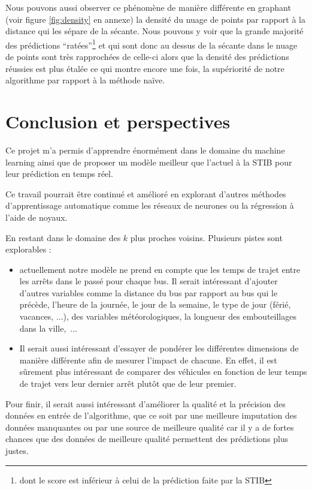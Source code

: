 \documentclass[letterpaper]{article}
\begin{document}
Nous pouvons aussi observer ce phénomène de manière différente en graphant (voir figure \ref{fig:density} en annexe) la densité du nuage de points par rapport à la distance qui les sépare de la sécante. Nous pouvons y voir que la grande majorité des prédictions ``ratées''\footnote{dont le score est inférieur à celui de la prédiction faite par la STIB} et qui sont donc au dessus de la sécante dans le nuage de points sont très rapprochées de celle-ci alors que la densité des prédictions réussies est plus étalée ce qui montre encore une fois, la supériorité de notre algorithme par rapport à la méthode naïve.


\section{Conclusion et perspectives}

Ce projet m'a permis d'apprendre énormément dans le domaine du machine learning ainsi que de proposer un modèle meilleur que l'actuel à la STIB pour leur prédiction en temps réel.

Ce travail pourrait être continué et amélioré en explorant d'autres méthodes d'apprentissage automatique comme les réseaux de neurones ou la régression à l'aide de noyaux.

En restant dans le domaine des $k$ plus proches voisins. Plusieurs pistes sont explorables :
\begin{itemize}
    \item actuellement notre modèle ne prend en compte que les temps de trajet entre les arrêts dans le passé pour chaque bus.
Il serait intéressant d'ajouter d'autres variables comme la distance du bus par rapport au bus qui le précède, l'heure de la journée, le jour de la semaine, le type de jour (férié, vacances, ...), des variables météorologiques, la longueur des embouteillages dans la ville,~...
    \item Il serait aussi intéressant d'essayer de pondérer les différentes dimensions de manière différente afin de mesurer l'impact de chacune. En effet, il est sûrement plus intéressant de comparer des véhicules en fonction de leur temps de trajet vers leur dernier arrêt plutôt que de leur premier.
\end{itemize}
\vspace{1em}

Pour finir, il serait aussi intéressant d'améliorer la qualité et la précision des données en entrée de l'algorithme, que ce soit par une meilleure imputation des données manquantes ou par une source de meilleure qualité car il y a de fortes chances que des données de meilleure qualité permettent des prédictions plus justes.
\end{document}
